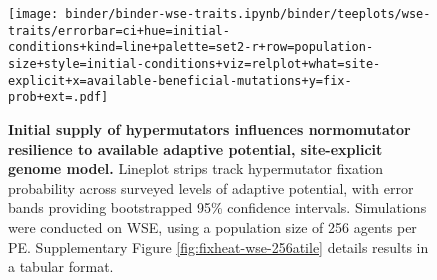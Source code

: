 \begin{figure}[h]
\begin{minipage}{0.6\textwidth}
  \texttt{[image: binder/binder-wse-traits.ipynb/binder/teeplots/wse-traits/errorbar=ci+hue=initial-conditions+kind=line+palette=set2-r+row=population-size+style=initial-conditions+viz=relplot+what=site-explicit+x=available-beneficial-mutations+y=fix-prob+ext=.pdf]}%
\end{minipage}%
\begin{minipage}{0.4\textwidth}
  \caption{
  \textbf{Initial supply of hypermutators influences normomutator resilience to available adaptive potential, site-explicit genome model.}
  \footnotesize
  Lineplot strips track hypermutator fixation probability across surveyed levels of adaptive potential, with error bands providing bootstrapped 95\% confidence intervals.
  Simulations were conducted on WSE, using a population size of 256 agents per PE.
  Supplementary Figure \ref{fig:fixheat-wse-256atile} details results in a tabular format.
    }
    \label{fig:denovo-5050-conditions-combined-site-explicit}
  \end{minipage}
\end{figure}
